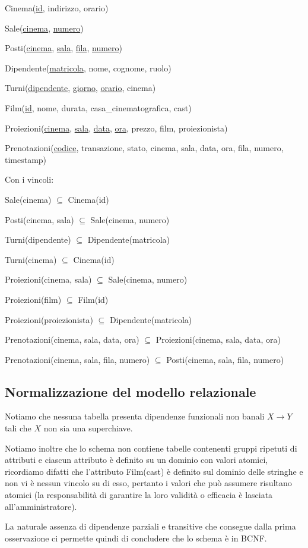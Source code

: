Cinema(\underline{id}, indirizzo, orario)

Sale(\underline{cinema}, \underline{numero})

Posti(\underline{cinema},
\underline{sala},
\underline{fila},
\underline{numero})

Dipendente(\underline{matricola}, nome, cognome, ruolo)

Turni(\underline{dipendente}, \underline{giorno}, \underline{orario}, cinema)

Film(\underline{id}, nome, durata, casa\_cinematografica, cast)

Proiezioni(\underline{cinema},
\underline{sala},
\underline{data},
\underline{ora},
prezzo,
film,
proiezionista)

Prenotazioni(\underline{codice},
transazione,
stato,
cinema,
sala,
data,
ora,
fila,
numero,
timestamp)

\quad Con i vincoli:

Sale(cinema) $\subseteq$ Cinema(id)

Posti(cinema, sala) $\subseteq$ Sale(cinema, numero)

Turni(dipendente) $\subseteq$ Dipendente(matricola)

Turni(cinema) $\subseteq$ Cinema(id)

Proiezioni(cinema, sala) $\subseteq$ Sale(cinema, numero)

Proiezioni(film) $\subseteq$ Film(id)

Proiezioni(proiezionista) $\subseteq$ Dipendente(matricola)

Prenotazioni(cinema, sala, data, ora)
$\subseteq$
Proiezioni(cinema, sala, data, ora)

Prenotazioni(cinema, sala, fila, numero)
$\subseteq$
Posti(cinema, sala, fila, numero)

\subsection*{Normalizzazione del modello relazionale}
%
%

Notiamo che nessuna tabella presenta dipendenze funzionali non banali
$X \rightarrow Y$ tali che $X$ non sia una superchiave.

Notiamo inoltre che lo schema non contiene tabelle contenenti gruppi ripetuti
di attributi e ciascun attributo è definito su un dominio con valori atomici,
ricordiamo difatti che l'attributo Film(cast) è definito sul dominio delle
stringhe e non vi è nessun vincolo su di esso, pertanto i valori che può
assumere risultano atomici (la responsabilità di garantire la loro validità o
efficacia è lasciata all'amministratore).

La naturale assenza di dipendenze parziali e transitive che consegue dalla
prima osservazione ci permette quindi di concludere che lo schema è in BCNF.
